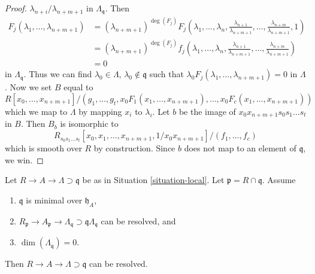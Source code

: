 \begin{proof}
$\lambda_{n + i}/\lambda_{n + m + 1}$ in $\Lambda_\mathfrak q$.
Then
\begin{align*}
F_j(\lambda_1, \ldots, \lambda_{n + m + 1})
& =
(\lambda_{n + m + 1})^{\deg(F_j)} F_j(\lambda_1, \ldots, \lambda_n,
\frac{\lambda_{n + 1}}{\lambda_{n + m + 1}}, \ldots,
\frac{\lambda_{n + m}}{\lambda_{n + m + 1}}, 1) \\
& =
(\lambda_{n + m + 1})^{\deg(F_j)} f_j(\lambda_1, \ldots, \lambda_n,
\frac{\lambda_{n + 1}}{\lambda_{n + m + 1}}, \ldots,
\frac{\lambda_{n + m}}{\lambda_{n + m + 1}}) \\
& = 0
\end{align*}
in $\Lambda_\mathfrak q$. Thus we can find
$\lambda_0 \in \Lambda$, $\lambda_0 \not \in \mathfrak q$ such that
$\lambda_0 F_j(\lambda_1, \ldots, \lambda_{n + m + 1}) = 0$
in $\Lambda$. Now we set $B$ equal to
$$
R[x_0, \ldots, x_{n + m + 1}]/
(g_1, \ldots, g_t, x_0F_1(x_1, \ldots, x_{n + m + 1}), \ldots,
x_0F_c(x_1, \ldots, x_{n + m + 1}))
$$
which we map to $\Lambda$ by mapping $x_i$ to $\lambda_i$.
Let $b$ be the image of $x_0 x_{n + m + 1} s_0 s_1 \ldots s_t$ in $B$.
Then $B_b$ is isomorphic to
$$
R_{s_0s_1 \ldots s_t}[x_0, x_1, \ldots, x_{n + m + 1}, 1/x_0x_{n + m + 1}]/
(f_1, \ldots, f_c)
$$
which is smooth over $R$ by construction.
Since $b$ does not map to an element of $\mathfrak q$, we win.
\end{proof}

\begin{lemma}
\label{lemma-delocalize-height-zero}
Let $R \to A \to \Lambda \supset \mathfrak q$ be as in
Situation \ref{situation-local}. Let $\mathfrak p = R \cap \mathfrak q$.
Assume
\begin{enumerate}
\item $\mathfrak q$ is minimal over $\mathfrak h_A$,
\item $R_\mathfrak p \to A_\mathfrak p \to \Lambda_\mathfrak q
\supset \mathfrak q\Lambda_\mathfrak q$ can be resolved, and
\item $\dim(\Lambda_\mathfrak q) = 0$.
\end{enumerate}
Then $R \to A \to \Lambda \supset \mathfrak q$ can be resolved.
\end{lemma}

